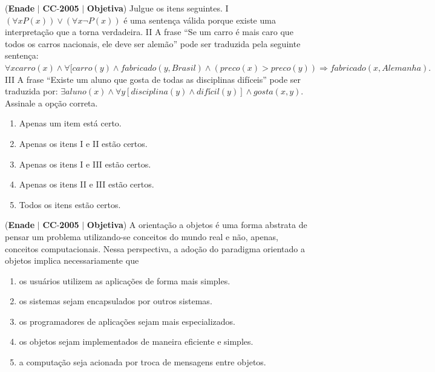 \documentclass{exam}
\begin{document}
\begin{questions}
\question (\textbf{Enade} $|$ \textbf{CC}-\textbf{2005} $|$ \textbf{Objetiva})
Julgue os itens seguintes.
I $(\forall x P(x)) \vee (\forall x \neg P(x)) $ é uma sentença válida porque existe
uma interpretação que a torna verdadeira.
II A frase “Se um carro é mais caro que todos os carros
nacionais, ele deve ser alemão” pode ser traduzida pela
seguinte sentença: $\forall x carro(x) \wedge \forall [carro(y) \wedge fabricado(y,Brasil) \wedge (preco(x) > preco(y)) \Rightarrow fabricado(x, Alemanha). $
III A frase “Existe um aluno que gosta de todas as disciplinas
difíceis” pode ser traduzida por: $\exists aluno(x) \wedge \forall y [disciplina(y) \wedge difícil(y)] \wedge gosta(x, y).$
Assinale a opção correta.
	\begin{enumerate}[label=\alph*)]
		\item  Apenas um item está certo.
		\item  Apenas os itens I e II estão certos.
		\item  Apenas os itens I e III estão certos.
		\item  Apenas os itens II e III estão certos.
		\item  Todos os itens estão certos.
	\end{enumerate}

\question (\textbf{Enade} $|$ \textbf{CC}-\textbf{2005} $|$ \textbf{Objetiva})
A orientação a objetos é uma forma abstrata de pensar um
problema utilizando-se conceitos do mundo real e não, apenas,
conceitos computacionais. Nessa perspectiva, a adoção do
paradigma orientado a objetos implica necessariamente que
	\begin{enumerate}[label=\alph*)]
		\item  os usuários utilizem as aplicações de forma mais simples.
		\item  os sistemas sejam encapsulados por outros sistemas.
		\item  os programadores de aplicações sejam mais especializados.
		\item  os objetos sejam implementados de maneira eficiente e
simples.
		\item  a computação seja acionada por troca de mensagens entre
objetos.
	\end{enumerate}


\end{questions}
\end{document}
